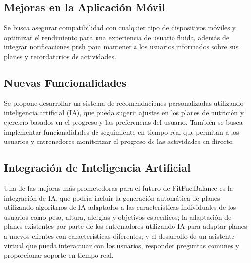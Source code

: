 \subsection{Mejoras en la Aplicación Móvil}
Se busca asegurar compatibilidad con cualquier tipo de dispositivos móviles y optimizar el rendimiento para una experiencia de usuario fluida, además de integrar notificaciones push para mantener a los usuarios informados sobre sus planes y recordatorios de actividades.

\subsection{Nuevas Funcionalidades}
Se propone desarrollar un sistema de recomendaciones personalizadas utilizando inteligencia artificial (IA), que pueda sugerir ajustes en los planes de nutrición y ejercicio basados en el progreso y las preferencias del usuario. También se busca implementar funcionalidades de seguimiento en tiempo real que permitan a los usuarios y entrenadores monitorizar el progreso de las actividades en directo.

\subsection{Integración de Inteligencia Artificial}
Una de las mejoras más prometedoras para el futuro de FitFuelBalance es la integración de IA, que podría incluir la generación automática de planes utilizando algoritmos de IA adaptados a las características individuales de los usuarios como peso, altura, alergias y objetivos específicos; la adaptación de planes existentes por parte de los entrenadores utilizando IA para adaptar planes a nuevos clientes con características diferentes; y el desarrollo de un asistente virtual que pueda interactuar con los usuarios, responder preguntas comunes y proporcionar soporte en tiempo real.
